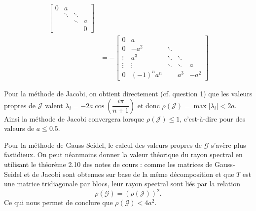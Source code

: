 \begin{align*}
  \begin{bmatrix}
    0 & a & &\\
      & \ddots &  \ddots &\\
      &  & \ddots  & a \\
      & &  & 0
  \end{bmatrix}\\
  & = -
  \begin{bmatrix}
    0 & a & & &\\
    0 & -a^2 & \ddots  & &\\
    \vdots & a^3 & \ddots & \ddots  &\\
    \vdots & \vdots & \ddots & \ddots  & a \\
    0 & (-1)^n a^n & & a^3 & -a^2
  \end{bmatrix}
\end{align*}

Pour la méthode de Jacobi, on obtient directement (cf. question 1) que les valeurs propres de $\mathcal{J}$ valent
$\lambda _i = -2a \cos(\dfrac{i \pi}{n+1})$ et donc $\rho(\mathcal{J}) = \max |\lambda_i| < 2a$.
Ainsi la méthode de Jacobi convergera lorsque $\rho(\mathcal{J}) \leq 1$, c'est-à-dire pour des valeurs de $a \leq 0.5$. 

Pour la méthode de Gauss-Seidel, le calcul des valeurs propres de $\mathcal{G}$ s'avère plus fastidieux. On peut néanmoins donner la valeur théorique du rayon spectral en utilisant le théorème 2.10 des notes de cours : comme les matrices de Gauss-Seidel et de Jacobi sont obtenues sur base de la même décomposition et que $T$ est une matrice tridiagonale par blocs, leur rayon spectral sont liés par la relation $$\rho (\mathcal{G}) = (\rho (\mathcal{J}))^2 .$$
Ce qui nous permet de conclure que $\rho (\mathcal{G}) < 4a^2$.

